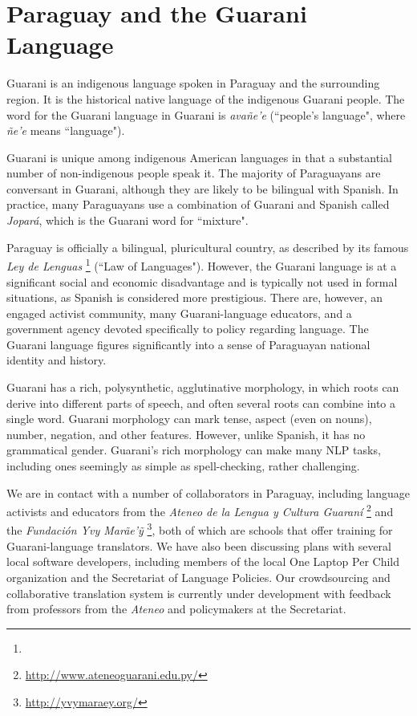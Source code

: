 \section{Paraguay and the Guarani Language}
Guarani is an indigenous language spoken in Paraguay and the surrounding
region.
It is the historical native language of the indigenous Guarani people. The
word for the Guarani language in Guarani is \emph{avañe'e} (``people's
language", where \emph{ñe'e} means ``language").

Guarani is unique among indigenous American languages in that a substantial
number of non-indigenous people speak it. The majority of Paraguayans are
conversant in Guarani, although they are likely to be bilingual with Spanish.
In practice, many Paraguayans use a combination of Guarani and Spanish called
\emph{Jopar{\'a}}, which is the Guarani word for ``mixture".

Paraguay is officially a bilingual, pluricultural country, as described by its
famous \emph{Ley de Lenguas} \footnote{\leydelenguas} (``Law of Languages").
However, the Guarani language is at a significant social and economic
disadvantage and is typically not used in formal situations, as Spanish is
considered more prestigious. There are, however, an engaged activist
community, many Guarani-language educators, and a government agency devoted
specifically to policy regarding language.
The Guarani language figures significantly into a sense of Paraguayan national
identity and history.

Guarani has a rich, polysynthetic, agglutinative morphology, in which roots can
derive into different parts of speech, and often several roots can combine into
a single word. Guarani morphology can mark tense, aspect (even on nouns),
number, negation, and other features. However, unlike Spanish, it has no
grammatical gender.  Guarani's rich morphology can make many NLP tasks,
including ones seemingly as simple as spell-checking, rather challenging.

We are in contact with a number of collaborators in Paraguay, including
language activists and educators from the \emph{Ateneo de la Lengua y Cultura
Guaraní} \footnote{\url{http://www.ateneoguarani.edu.py/}} and the
\emph{Fundación Yvy Marãe'{\~y}} \footnote{\url{http://yvymaraey.org/}},
both of which are schools that offer training for Guarani-language translators.
We have also been discussing plans with several local software
developers, including members of the local One Laptop Per Child organization
and the Secretariat of Language Policies. Our crowdsourcing and
collaborative translation system \cite{RUDNICK14.151} is currently under
development with feedback from professors from the \emph{Ateneo} and
policymakers at the Secretariat.

